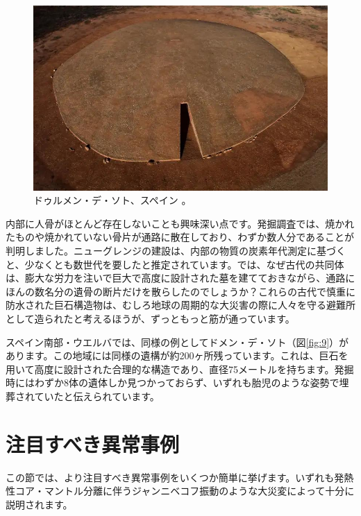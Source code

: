 \documentclass[10pt,twocolumn,letterpaper]{article}
\begin{document}
\begin{figure}[b]
\begin{center}
   \includegraphics[width=1\linewidth]{dolmen.jpg}
\end{center}
   \caption{ドゥルメン・デ・ソト、スペイン \cite{53}。}
\label{fig:9}
\label{fig:onecol}
\end{figure}

内部に人骨がほとんど存在しないことも興味深い点です。発掘調査では、焼かれたものや焼かれていない骨片が通路に散在しており、わずか数人分であることが判明しました。ニューグレンジの建設は、内部の物質の炭素年代測定に基づくと、少なくとも数世代を要したと推定されています。では、なぜ古代の共同体は、膨大な労力を注いで巨大で高度に設計された墓を建てておきながら、通路にほんの数名分の遺骨の断片だけを散らしたのでしょうか？これらの古代で慎重に防水された巨石構造物は、むしろ地球の周期的な大災害の際に人々を守る避難所として造られたと考えるほうが、ずっともっと筋が通っています。

スペイン南部・ウエルバでは、同様の例としてドメン・デ・ソト（図\ref{fig:9}）があります。この地域には同様の遺構が約200ヶ所残っています\cite{72,32}。これは、巨石を用いて高度に設計された合理的な構造であり、直径75メートルを持ちます。発掘時にはわずか8体の遺体しか見つかっておらず、いずれも胎児のような姿勢で埋葬されていたと伝えられています。

\section{注目すべき異常事例}

この節では、より注目すべき異常事例をいくつか簡単に挙げます。いずれも発熱性コア・マントル分離に伴うジャンニベコフ振動のような大災変によって十分に説明されます。
\end{document}
